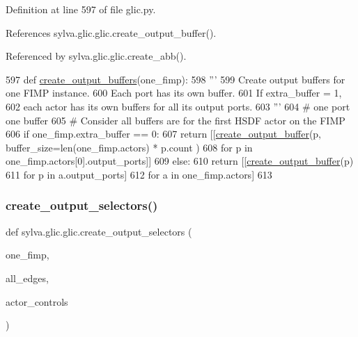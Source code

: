 Definition at line 597 of file glic.\+py.



References sylva.\+glic.\+glic.\+create\+\_\+output\+\_\+buffer().



Referenced by sylva.\+glic.\+glic.\+create\+\_\+abb().


\begin{DoxyCode}
597     \textcolor{keyword}{def }\hyperlink{namespacesylva_1_1glic_1_1glic_a53c55762a3c7d476be7ee748baeccbeb}{create\_output\_buffers}(one\_fimp):
598         \textcolor{stringliteral}{'''}
599 \textcolor{stringliteral}{          Create output buffers for one FIMP instance.}
600 \textcolor{stringliteral}{          Each port has its own buffer.}
601 \textcolor{stringliteral}{          If extra\_buffer = 1,}
602 \textcolor{stringliteral}{            each actor has its own buffers for all its output ports.}
603 \textcolor{stringliteral}{        '''}
604         \textcolor{comment}{# one port one buffer}
605         \textcolor{comment}{# Consider all buffers are for the first HSDF actor on the FIMP}
606         \textcolor{keywordflow}{if} one\_fimp.extra\_buffer == 0:
607             \textcolor{keywordflow}{return} [[\hyperlink{namespacesylva_1_1glic_1_1glic_a414741c04de0838d506dbeee050368a6}{create\_output\_buffer}(p, buffer\_size=len(one\_fimp.actors) * p.count
      )
608                      \textcolor{keywordflow}{for} p \textcolor{keywordflow}{in} one\_fimp.actors[0].output\_ports]]
609         \textcolor{keywordflow}{else}:
610             \textcolor{keywordflow}{return} [[\hyperlink{namespacesylva_1_1glic_1_1glic_a414741c04de0838d506dbeee050368a6}{create\_output\_buffer}(p)
611                      \textcolor{keywordflow}{for} p \textcolor{keywordflow}{in} a.output\_ports]
612                     \textcolor{keywordflow}{for} a \textcolor{keywordflow}{in} one\_fimp.actors]
613 
\end{DoxyCode}
\mbox{\label{namespacesylva_1_1glic_1_1glic_a7eb9347832747ffffb52851a1ee2d08f}} 
\subsubsection{\texorpdfstring{create\+\_\+output\+\_\+selectors()}{create\_output\_selectors()}}
{\footnotesize\ttfamily def sylva.\+glic.\+glic.\+create\+\_\+output\+\_\+selectors (\begin{DoxyParamCaption}\item[{}]{one\+\_\+fimp,  }\item[{}]{all\+\_\+edges,  }\item[{}]{actor\+\_\+controls }\end{DoxyParamCaption})}

